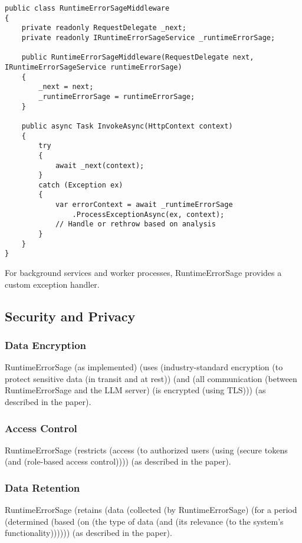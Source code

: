 \begin{lstlisting}[style=csharpstyle,caption={ASP.NET Core Middleware Integration},label=lst:middleware-impl]
public class RuntimeErrorSageMiddleware
{
    private readonly RequestDelegate _next;
    private readonly IRuntimeErrorSageService _runtimeErrorSage;

    public RuntimeErrorSageMiddleware(RequestDelegate next, IRuntimeErrorSageService runtimeErrorSage)
    {
        _next = next;
        _runtimeErrorSage = runtimeErrorSage;
    }

    public async Task InvokeAsync(HttpContext context)
    {
        try
        {
            await _next(context);
        }
        catch (Exception ex)
        {
            var errorContext = await _runtimeErrorSage
                .ProcessExceptionAsync(ex, context);
            // Handle or rethrow based on analysis
        }
    }
}
\end{lstlisting}

For background services and worker processes, RuntimeErrorSage provides a custom exception handler.

\subsection{Security and Privacy}

\subsubsection{Data Encryption}
RuntimeErrorSage (as implemented) (uses (industry-standard encryption (to protect sensitive data (in transit and at rest)) (and (all communication (between RuntimeErrorSage and the LLM server) (is encrypted (using TLS))) (as described in the paper).

\subsubsection{Access Control}
RuntimeErrorSage (restricts (access (to authorized users (using (secure tokens (and (role-based access control)))) (as described in the paper).

\subsubsection{Data Retention}
RuntimeErrorSage (retains (data (collected (by RuntimeErrorSage) (for a period (determined (based (on (the type of data (and (its relevance (to the system's functionality)))))) (as described in the paper).

